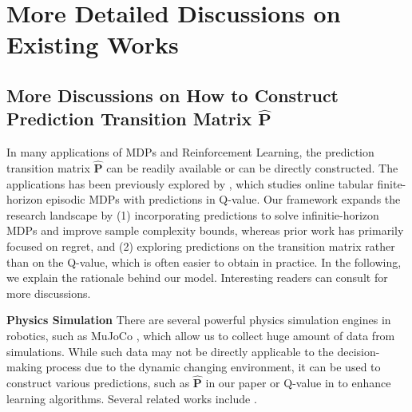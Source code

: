 \documentclass[12pt]{article}
\begin{document}


\newpage
\appendix
\onecolumn

\section{More Detailed Discussions on Existing Works}

\subsection{More Discussions on How to Construct Prediction Transition Matrix $\hat{\boldsymbol{\text{P}}}$}

\label{sec:app-discuss-prediction-P}

In many applications of MDPs and Reinforcement Learning, the prediction transition matrix $\hat{\boldsymbol{\text{P}}}$ can be readily available or can be directly constructed. The applications has been previously explored by \cite{golowich2022can}, which studies online tabular finite-horizon episodic MDPs with predictions in Q-value. Our framework expands the research landscape by (1) incorporating predictions to solve infinitie-horizon MDPs and improve sample complexity bounds, whereas prior work has primarily focused on regret, and (2) exploring predictions on the transition matrix rather than on the Q-value, which is often easier to obtain in practice. In the following, we explain the rationale behind our model.
Interesting readers can consult \cite{golowich2022can} for more discussions.


\textbf{Physics Simulation} There are several powerful physics simulation engines in robotics, such as MuJoCo \cite{todorov2012mujoco,lazaridis2020deep,tessler2019action,weng2022tianshou}, which allow us to collect huge amount of data from simulations. While such data may not be directly applicable to the decision-making process due to the dynamic changing environment, it can be used to construct various predictions, such as $\hat{\boldsymbol{\text{P}}}$ in our paper or Q-value in \cite{golowich2022can} to enhance learning algorithms. Several related works include \cite{zhao2020sim,peng2018sim,collins2021review}. 
\end{document}
